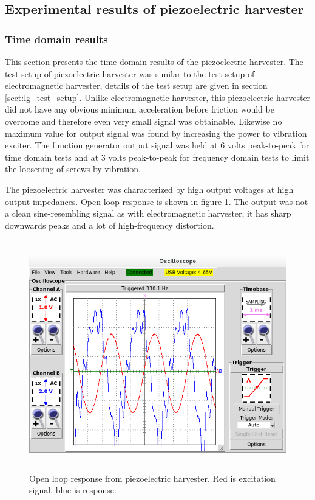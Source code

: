 \subsection{Experimental results of piezoelectric harvester}

\subsubsection{Time domain results}
This section presents the time-domain results of the piezoelectric harvester. The test setup of piezoelectric harvester was similar to the test setup of electromagnetic harvester, details of the test setup are given in section \ref{sect:lg_test_setup}. Unlike electromagnetic harvester, this piezoelectric harvester did not have any obvious minimum acceleration before friction would be overcome and therefore even very small signal was obtainable. Likewise no maximum value for output signal was found by increasing the power to vibration exciter. The function generator output signal was held at 6 volts peak-to-peak for time domain tests and at 3 volts peak-to-peak for frequency domain tests to limit the loosening of screws by vibration.

The piezoelectric harvester was characterized by high output voltages at high output impedances. Open loop response is shown in figure \ref{fig:piezo_td_open}. The output was not a clean sine-resembling signal as with electromagnetic harvester, it has sharp downwards peaks and a lot of high-frequency distortion.

\begin{figure}[htb]
\begin{center}
\includegraphics[height=10cm]{images/own_measurement/generator_shaker/piezo_td_open_330hz_2_2.png}
\end{center}
\caption{\label{fig:piezo_td_open} Open loop response from piezoelectric harvester. Red is excitation signal, blue is response.}
\end{figure}

